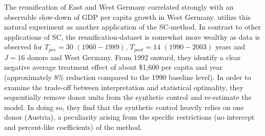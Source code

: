 The reunification of East and West Germany correlated strongly with an observable slow-down of \ac{GDP} per capita growth in West Germany. \cite{abadie:2015} utilize this natural experiment as another application of the \ac{SC}-method. In contrast to other applications of \ac{SC}, the reunification-dataset is somewhat more wealthy as data is observed for $T_{pre} = 30$ $(1960-1989)$, $T_{post} = 14$ $(1990-2003)$ years and $J = 16$ donors and West Germany. From 1992 onward, they identify a clear negative average treatment effect of about \$1,600 per capita and year (approximately 8\% reduction compared to the 1990 baseline level). In order to examine the trade-off between interpretation and statistical optimality, they sequentially remove donor units from the synthetic control and re-estimate the model. In doing so, they find that the synthetic control heavily relies on one donor (Austria), a peculiarity arising from the specific restrictions (no intercept and percent-like coefficients) of the method.

